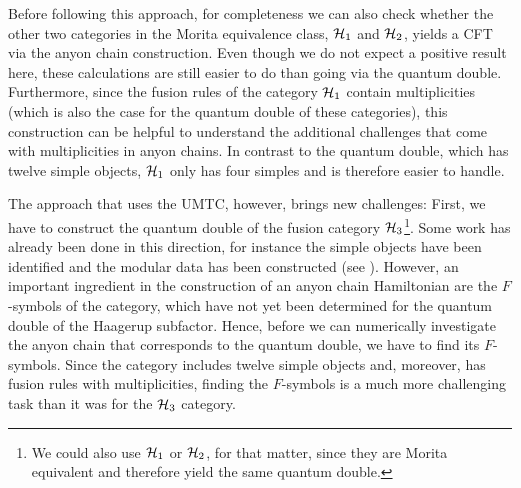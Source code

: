 Before following this approach, for completeness we can also check whether the other two categories in the Morita equivalence class, ${\mathcal{H}}_1$ and ${\mathcal{H}}_2$, yields a CFT via the anyon chain construction. Even though we do not expect a positive result here, these calculations are still easier to do than going via the quantum double. Furthermore, since the fusion rules of the category ${\mathcal{H}}_1$ contain multiplicities (which is also the case for the quantum double of these categories), this construction can be helpful to understand the additional challenges that come with multiplicities in anyon chains. In contrast to the quantum double, which has twelve simple objects, ${\mathcal{H}}_1$ only has four simples and is therefore easier to handle.

The approach that uses the UMTC, however, brings new challenges: First, we have to construct the quantum double of the fusion category ${\mathcal{H}_3}$\footnote{We could also use ${\mathcal{H}}_1$ or ${\mathcal{H}}_2$, for that matter, since they are Morita equivalent and therefore yield the same quantum double.}. Some work has already been done in this direction, for instance the simple objects have been identified and the modular data has been constructed (see \cite{izumi_structure_2001,SEUNGMOON2008,Evans2011,Grossman2015}). However, an important ingredient in the construction of an anyon chain Hamiltonian are the $F$-symbols of the category, which have not yet been determined for the quantum double of the Haagerup subfactor. Hence, before we can numerically investigate the anyon chain that corresponds to the quantum double, we have to find its $F$-symbols. Since the category includes twelve simple objects and, moreover, has fusion rules with multiplicities, finding the $F$-symbols is a much more challenging task than it was for the ${\mathcal{H}_3}$ category.
